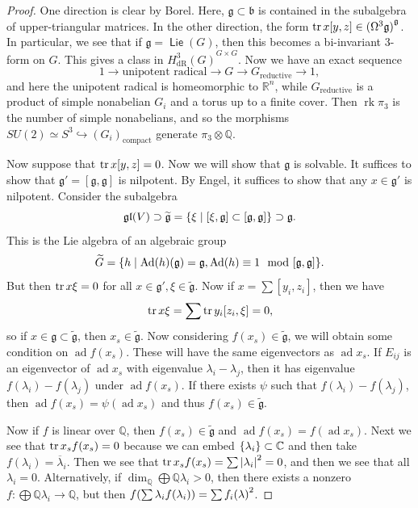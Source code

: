 \documentclass[leqno, openany]{memoir}
\theoremstyle{definition}
\theoremstyle{remark}
\theoremstyle{plain}
\theoremstyle{definition}
\theoremstyle{remark}
\newcommand{\R}{\mathbb{R}}
\newcommand{\C}{\mathbb{C}}
\newcommand{\Q}{\mathbb{Q}}
\newcommand{\mf}[1]{\mathfrak{#1}}
\newcommand{\mr}[1]{\mathrm{#1}}
\newcommand{\ol}[1]{\overline{#1}}
\newcommand{\wtl}[1]{\widetilde{#1}}
\DeclareMathOperator{\ad}{ad}
\DeclareMathOperator{\Ad}{Ad}
\DeclareMathOperator{\Lie}{\mathsf{Lie}}
\begin{document}
\begin{proof}
    One direction is clear by Borel. Here, $\mf{g} \subset \mf{b}$ is contained in the subalgebra of upper-triangular matrices. In the other direction, the form $\trace x[y,z] \in { ( \Omega^3 \mf{g} ) }^{\mf{g}}$. In particular, we see that if $\mf{g} = \Lie(G)$, then this becomes a bi-invariant $3$-form on $G$. This gives a class in ${H^3_{\mr{dR}}(G)}^{G \times G}$. Now we have an exact sequence
    \[ 1 \to \text{unipotent radical} \to G \to G_{\text{reductive}} \to 1, \]
    and here the unipotent radical is homeomorphic to $\R^n$, while $G_{\text{reductive}}$ is a product of simple nonabelian $G_i$ and a torus up to a finite cover. Then $\operatorname{rk} \pi_3$ is the number of simple nonabelians, and so the morphisms $SU(2) \simeq S^3 \hookrightarrow {(G_i)}_{\text{compact}}$ generate $\pi_3 \otimes \Q$.

    Now suppose that $\trace x[y,z] = 0$. Now we will show that $\mf{g}$ is solvable. It suffices to show that $\mf{g}' = [\mf{g}, \mf{g}]$ is nilpotent. By Engel, it suffices to show that any $x \in \mf{g}'$ is nilpotent. Consider the subalgebra
    \[ \mf{gl}(V) \supset \wtl{\mf{g}} = \qty{ \xi \mid [\xi, \mf{g}] \subset [\mf{g}, \mf{g}] } \supset \mf{g}. \]
    This is the Lie algebra of an algebraic group 
    \[ \wtl{G} = \qty{h \mid \Ad (h) (\mf{g}) = \mf{g}, \Ad (h) \equiv 1 \mod [\mf{g}, \mf{g}]}. \]
    But then $\tr x \xi = 0$ for all $x \in \mf{g}', \xi \in \wtl{\mf{g}}$. Now if $x = \sum [y_i, z_i]$, then we have
    \[ \tr x \xi = \sum \tr y_i [z_i, \xi] = 0, \]
    so if $x \in \mf{g} \subset \wtl{\mf{g}}$, then $x_s \in \wtl{\mf{g}}$. Now considering $f(x_s) \in \wtl{\mf{g}}$, we will obtain some condition on $\ad f(x_s)$. These will have the same eigenvectors as $\ad x_s$. If $E_{ij}$ is an eigenvector of $\ad x_s$ with eigenvalue $\lambda_i - \lambda_j$, then it has eigenvalue $f(\lambda_i) - f(\lambda_j)$ under $\ad f(x_s)$. If there exists $\psi$ such that $f(\lambda_i) - f(\lambda_j)$, then $\ad f(x_s) = \psi(\ad x_s)$ and thus $f(x_s) \in \wtl{\mf{g}}$.

    Now if $f$ is linear over $\Q$, then $f(x_s) \in \wtl{\mf{g}}$ and $\ad f(x_s) = f(\ad x_s)$. Next we see that $\tr x_s f(x_s) = 0$ because we can embed $\qty{\lambda_i} \subset \C$ and then take $f(\lambda_i) = \ol{\lambda}_i$. Then we see that $\tr x_s f(x_s) = \sum \abs{\lambda_i}^2 = 0$, and then we see that all $\lambda_i = 0$. Alternatively, if $\dim_{\Q} \bigoplus \Q \lambda_i > 0$, then there exists a nonzero $f \colon \bigoplus \Q \lambda_i \to \Q$, but then $f \qty(\sum \lambda_i f(\lambda_i)) = \sum {f_i(\lambda)}^2$.
\end{proof}
\end{document}
